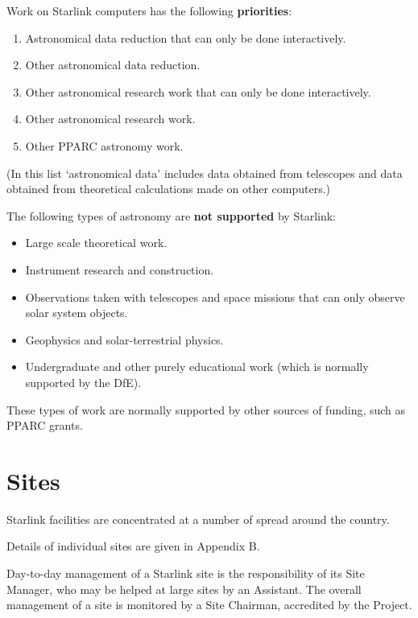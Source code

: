 Work on Starlink computers has the following {\bf priorities}:

\begin{enumerate}
\item Astronomical data reduction that can only be done interactively.
\item Other astronomical data reduction.
\item Other astronomical research work that can only be done interactively.
\item Other astronomical research work.
\item Other PPARC astronomy work.
\end{enumerate}

(In this list `astronomical data' includes data obtained from telescopes
and data obtained from theoretical calculations made on other computers.)

\newpage

The following types of astronomy are {\bf not supported} by Starlink:

\begin{itemize}
\item Large scale theoretical work.
\item Instrument research and construction.
\item Observations taken with telescopes and space missions that can only
 observe solar system objects.
\item Geophysics and solar-terrestrial physics.
\item Undergraduate and other purely educational work (which is normally
 supported by the DfE).
\end{itemize}

These types of work are normally supported by other sources of funding, such as
PPARC grants.


\newpage

\section*{Sites}

Starlink facilities are concentrated at a number of
spread around the country.
\begin{latexonly}
Details of individual sites are given in Appendix B.
\end{latexonly}

Day-to-day management of a Starlink site is the responsibility of its
Site Manager, who may be helped at large sites by an Assistant.
The overall management of a site is monitored by a Site Chairman, accredited by
the Project.

